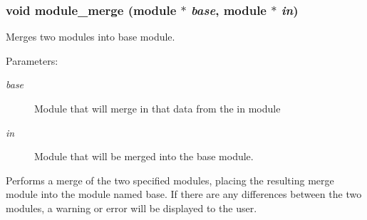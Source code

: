 \subsubsection{\setlength{\rightskip}{0pt plus 5cm}void module\_\-merge ({\bf module} $\ast$ {\em base}, {\bf module} $\ast$ {\em in})}\label{module_8c_a2}


Merges two modules into base module.

\begin{Desc}
\item[Parameters: ]\par
\begin{description}
\item[{\em 
base}]Module that will merge in that data from the in module \item[{\em 
in}]Module that will be merged into the base module.\end{description}
\end{Desc}
Performs a merge of the two specified modules, placing the resulting merge module into the module named base. If there are any differences between the two modules, a warning or error will be displayed to the user. 